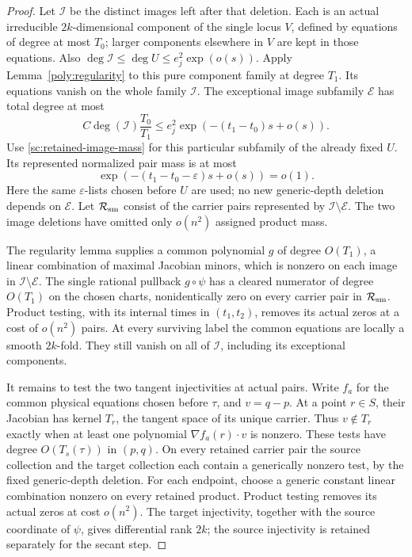 \begin{proof}
Let $\mathcal I$ be the distinct images left after that deletion.
Each is an actual irreducible $2k$-dimensional component of the single
locus $V$, defined by equations of degree at most $T_0$; larger components
elsewhere in $V$ are kept in those equations.  Also
$\deg\mathcal I\le\deg U\le e_j^2\exp(o(s))$.
Apply Lemma~\ref{poly:regularity} to this pure component family at degree
$T_1$.  Its equations vanish on the whole family $\mathcal I$.
The exceptional image subfamily $\mathcal E$ has total degree at most
\[
 C\deg(\mathcal I)\frac{T_0}{T_1}
 \le e_j^2\exp(-(t_1-t_0)s+o(s)).
\]
Use \eqref{sc:retained-image-mass} for this particular subfamily of the
already fixed $U$.  Its represented normalized pair mass is at most
\[
 \exp(-(t_1-t_0-\varepsilon)s+o(s))=o(1).
\]
Here the same $\varepsilon$-lists chosen before $U$ are used; no new
generic-depth deletion depends on $\mathcal E$.  Let
$\mathcal R_{\rm sm}$ consist of the carrier pairs represented by
$\mathcal I\setminus\mathcal E$.  The two image deletions have omitted
only $o(n^2)$ assigned product mass.

The regularity lemma supplies a common polynomial $g$ of degree $O(T_1)$,
a linear combination of maximal Jacobian minors, which is nonzero on each
image in $\mathcal I\setminus\mathcal E$.  The single rational pullback
$g\circ\psi$ has a cleared numerator of degree $O(T_1)$ on the chosen
charts, nonidentically zero on every carrier pair in $\mathcal R_{\rm sm}$.
Product testing, with its
internal times in $(t_1,t_2)$, removes its actual zeros at a cost of
$o(n^2)$ pairs.  At every surviving label the common equations are locally
a smooth $2k$-fold.  They still vanish on all of $\mathcal I$, including
its exceptional components.

It remains to test the two tangent injectivities at actual pairs.
Write $f_a$ for the common physical equations chosen before $\tau$, and
$v=q-p$.  At a point $r\in S$, their Jacobian has kernel $T_r$, the tangent
space of its unique carrier.  Thus $v\notin T_r$ exactly when at least one
polynomial $\nabla f_a(r)\mathbin{\cdot}v$ is nonzero.  These tests have
degree $O(T_s(\tau))$ in $(p,q)$.  On every retained carrier pair the
source collection and the target collection each contain a generically
nonzero test, by the fixed generic-depth deletion.  For each endpoint,
choose a generic constant linear combination nonzero on every retained
product.  Product testing removes its actual zeros at cost $o(n^2)$.
The target injectivity, together with the source coordinate of $\psi$,
gives differential rank $2k$; the source injectivity is retained
separately for the secant step.


\end{proof}
